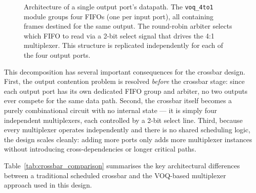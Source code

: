 \begin{figure}[htbp]
    \caption{Architecture of a single output port's datapath. The \texttt{voq\_4to1} module 
    groups four FIFOs (one per input port), all containing frames destined for the same output. 
    The round-robin arbiter selects which FIFO to read via a 2-bit select signal that drives 
    the 4:1 multiplexer. This structure is replicated independently for each of the four 
    output ports.}
    \label{fig:voq_mux_arch}
\end{figure}

This decomposition has several important consequences for the crossbar design. First, 
the output contention problem is resolved \emph{before} the crossbar stage: since each 
output port has its own dedicated FIFO group and arbiter, no two outputs ever compete 
for the same data path. Second, the crossbar itself becomes a purely combinational 
circuit with no internal state --- it is simply four independent multiplexers, each 
controlled by a 2-bit select line. Third, because every multiplexer operates 
independently and there is no shared scheduling logic, the design scales cleanly: 
adding more ports only adds more multiplexer instances without introducing 
cross-dependencies or longer critical paths.

Table~\ref{tab:crossbar_comparison} summarises the key architectural differences between 
a traditional scheduled crossbar and the VOQ-based multiplexer approach used in this design.

